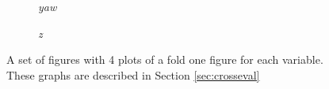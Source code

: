 \begin{figure}\ContinuedFloat
	\begin{subfigure}[b]{1.1\textwidth}
		\caption{\emph{yaw}}
		\label{fig:yaw_pred100-n}
	\end{subfigure}
	\begin{subfigure}[b]{1.1\textwidth}
		\caption{\emph{z}}
		\label{fig:z_pred100-n}
	\end{subfigure}
	\caption{A set of figures with 4 plots of a fold one figure for each variable. These graphs are described in Section \ref{sec:crosseval}}
	\label{fig:pred100-n}
\end{figure}